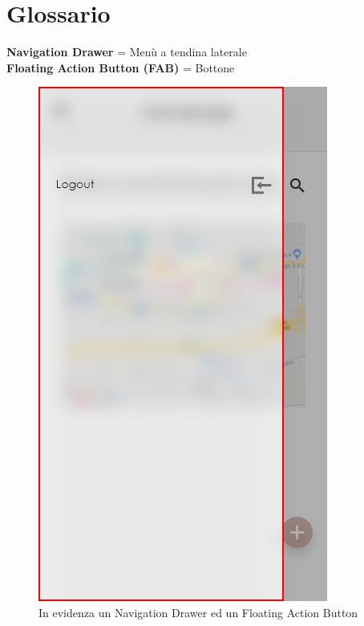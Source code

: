 \section{Glossario}
\textbf{Navigation Drawer} = Menù a tendina laterale\\
\textbf{Floating Action Button (FAB)} = Bottone
\begin{figure}[H]
    \caption{In evidenza un Navigation Drawer ed un Floating Action Button}
    \includegraphics[scale=0.4]{Figures/DrawerUtenteL.png}

\end{figure}
